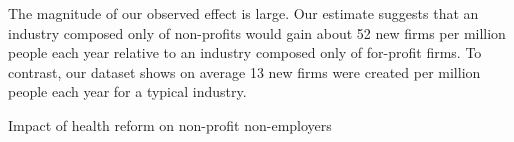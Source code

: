 \documentclass[12pt]{article}
\begin{document}
The magnitude of our observed effect is large. Our estimate suggests that an industry composed only of non-profits would gain about 52 new firms per million people each year relative to an industry composed only of for-profit firms. To contrast, our dataset shows on average 13 new firms were created per million people each year for a typical industry. 

\begin{table}[H]
	\footnotesize
	\centering
	\caption{Impact of health reform on non-profit non-employers}
	
	\label{tab:nonprofit}
\end{table}

\begin{comment}

\multicolumn{5}{l}{\footnotesize Column (1) is a diff-in-diff model of non-employers per million people in Massachusetts from  }\\ 
\multicolumn{5}{l}{\footnotesize \space 2000 to 2012 with treatment after 2007 and treatment intensity equal to percentage of non-profit}\\ 
\multicolumn{5}{l}{\footnotesize \space firms within industry.}\\ 
\multicolumn{5}{l}{\footnotesize Non-profit industries defined by 4 digit NAICS codes where over half of firms were tax-exempt }\\
\multicolumn{5}{l}{\footnotesize  \space according to 2007 Economic Census data.}\\
\multicolumn{5}{l}{\footnotesize Maine, Connecticut, Vermont, Rhode Island and New Hampshire used as controls in column (2) }\\
\multicolumn{5}{l}{\footnotesize \space under triple diff model. }\\
\multicolumn{5}{l}{\footnotesize Column (3) restricts the dataset to counties that border other states across Massachusetts, }\\
\multicolumn{5}{l}{\footnotesize \space Connecticut, Vermont, Rhode Island, New Hampshire and New York. }\\
\multicolumn{5}{l}{\footnotesize Column (4) uses a synthetic control model that matches each Massachuetts industry by county }\\
\multicolumn{5}{l}{\footnotesize \space pre-trend against US counties with similar income, age, urban and insurance rate characteristics. }\\

\begin{table}[H]
	\centering
	
	\caption{Impact of health reform on non-profit entrepreneurship}
\end{table}

\end{comment}
\end{document}
